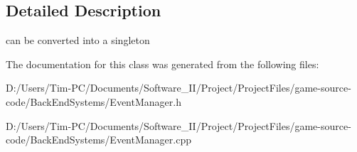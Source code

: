 \subsection{Detailed Description}
can be converted into a singleton 

The documentation for this class was generated from the following files\+:\begin{DoxyCompactItemize}
\item 
D\+:/\+Users/\+Tim-\/\+P\+C/\+Documents/\+Software\+\_\+\+I\+I/\+Project/\+Project\+Files/game-\/source-\/code/\+Back\+End\+Systems/Event\+Manager.\+h\item 
D\+:/\+Users/\+Tim-\/\+P\+C/\+Documents/\+Software\+\_\+\+I\+I/\+Project/\+Project\+Files/game-\/source-\/code/\+Back\+End\+Systems/Event\+Manager.\+cpp\end{DoxyCompactItemize}
